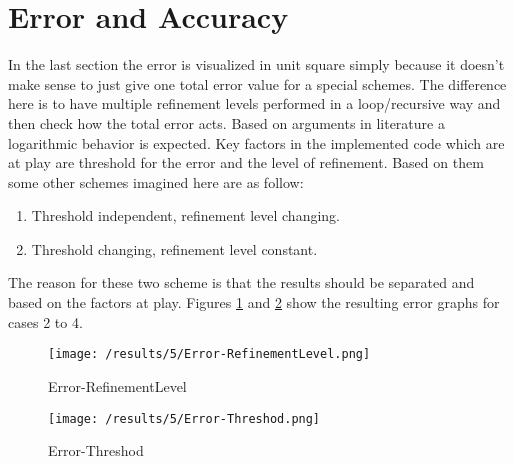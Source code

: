 \section{Error and Accuracy}
In the last section the error is visualized in unit square simply because it doesn't make sense to just give one total error value for a special schemes. The difference here is to have multiple refinement levels performed in a loop/recursive way and then check how the total error acts. Based on arguments in literature a logarithmic behavior is expected. Key factors in the implemented code which are at play are threshold for the error and the level of refinement. Based on them some other schemes imagined here are as follow:
\begin{enumerate}
\item Threshold independent, refinement level changing.
\item Threshold changing, refinement level constant.
\end{enumerate}
The reason for these two scheme is that the results should be separated and based on the factors at play. Figures \ref{fig:ErrorRefinementLevel} and \ref{fig:ErrorThreshod} show the resulting error graphs for cases 2 to 4.


\begin{figure}[h]
	\centering
	    \texttt{[image: /results/5/Error-RefinementLevel.png]}
		\centering    
	 \caption{Error-RefinementLevel}
       \label{fig:ErrorRefinementLevel}
\end{figure}

\begin{figure}[h]
	\centering
	    \texttt{[image: /results/5/Error-Threshod.png]}
		\centering    
	 \caption{Error-Threshod}
       \label{fig:ErrorThreshod}
\end{figure}



